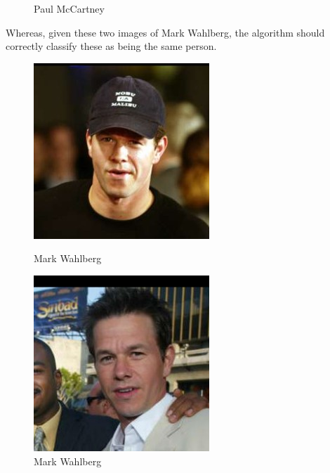 \documentclass[12pt, a4paper]{article}
\begin{document}
\begin{figure}[H]
  \caption{Paul McCartney}
\endminipage\hfill
\end{figure}
Whereas, given these two images of Mark Wahlberg, the algorithm should correctly classify these as being the same person.

\begin{figure}[H]
  \includegraphics[width=\linewidth]{images/Mark_Wahlberg_0001.jpg}
  \caption{Mark Wahlberg}
\endminipage\hfill
{}
  \includegraphics[width=\linewidth]{images/Mark_Wahlberg_0004.jpg}
  \caption{Mark Wahlberg}
\endminipage\hfill
\end{figure}
\end{document}
